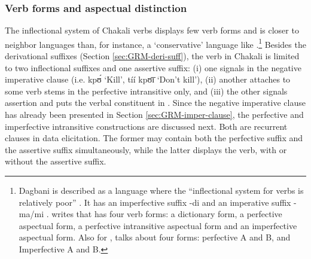 \begin{exe}
\begin{exe}
\begin{exe}
\begin{exe}
\begin{exe}
\begin{exe}
\begin{exe}
\begin{exe}
\begin{exe}
\begin{exe}
\begin{exe}
\subsubsection{Verb forms and aspectual distinction}
\label{sec:GRM-verb-word}

The inflectional system of Chakali verbs displays  few verb
forms and is closer  to neighbor  languages than, for instance,  a
`conservative'  language like  \citep[51]{Bonv88}.\footnote{Dagbani is
described as a language where the ``inflectional system  for verbs is relatively
poor''  \citep[96]{Olaw99}. It has an imperfective suffix {\sls -di}
\citep[97]{Olaw99} and  an imperative suffix {\sls -ma}/{\sls mi} 
\citep[101]{Olaw99}.
\citet[81]{Bodo97} writes that  has four verb forms: a dictionary
form, a perfective aspectual form, a perfective intransitive aspectual form and
an imperfective aspectual form. Also for , \citet{Saan03}  talks about
four forms: perfective A and B, and Imperfective A  and B.}  Besides the
derivational suffixes (Section \ref{sec:GRM-deri-suff}), the verb in Chakali is
limited to two
inflectional suffixes and one assertive suffix:  (i) one signals  in the
negative imperative clause (i.e.  {\sls  kpʊ́} `Kill',  {\sls tíí kpʊ̄ɪ̄} 
`Don't
kill'),  (ii) another attaches to some verb stems in the perfective intransitive
only, and (iii)  the other signals assertion and puts the verbal constituent in
. Since the negative imperative clause has already been presented in
Section
\ref{sec:GRM-imper-clause}, the perfective and imperfective intransitive
constructions are discussed next.  Both are recurrent clauses in data
elicitation. The former may contain both the perfective
suffix and the assertive suffix simultaneously, while the latter  displays the
 verb, with or without the assertive suffix.
 

\end{exe}
\end{exe}
\end{exe}
\end{exe}
\end{exe}
\end{exe}
\end{exe}
\end{exe}
\end{exe}
\end{exe}
\end{exe}
